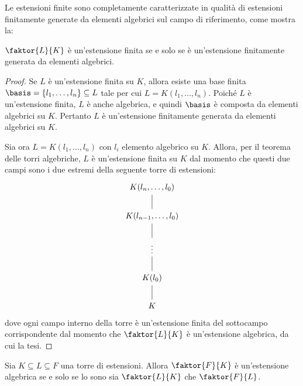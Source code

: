 \documentclass[12pt]{scrartcl}
\begin{document}
	Le estensioni finite sono completamente caratterizzate
	in qualità di estensioni finitamente generate da elementi
	algebrici sul campo di riferimento, come mostra la:
	
	\begin{proposition}
		$\faktor{L}{K}$ è un'estensione finita se e solo se
		è un'estensione finitamente generata da elementi algebrici.
	\end{proposition}
	
	\begin{proof}
		Se $L$ è un'estensione finita su $K$, allora esiste una
		base finita $\basis = \{l_1, \ldots, l_n\} \subseteq L$
		tale per cui $L = K(l_1, \ldots, l_n)$. Poiché $L$ è
		un'estensione finita, $L$ è anche algebrica, e quindi
		$\basis$ è composta da elementi algebrici su $K$. Pertanto
		$L$ è un'estensione finitamente generata da elementi algebrici
		su $K$. \medskip
		
		Sia ora $L = K(l_1, \ldots, l_n)$ con $l_i$ elemento algebrico
		su $K$. Allora, per il teorema delle torri algebriche,
		$L$ è un'estensione
		finita su $K$ dal momento che questi due campi sono
		i due estremi della seguente torre di estensioni:
		\[\begin{tikzcd}
			{K(l_n, \ldots, l_0)} \\
			{K(l_{n-1}, \ldots, l_0) } \\
			\vdots \\
			{K(l_0)} \\
			K
			\arrow[no head, from=1-1, to=2-1]
			\arrow[no head, from=2-1, to=3-1]
			\arrow[no head, from=3-1, to=4-1]
			\arrow[no head, from=4-1, to=5-1]
		\end{tikzcd}\]
		dove ogni campo interno della torre è un'estensione
		finita del sottocampo corrispondente dal momento
		che $\faktor{L}{K}$ è un'estensione algebrica, da
		cui la tesi.
	\end{proof}

	\begin{proposition}
		Sia $K \subseteq L \subseteq F$ una torre di
		estensioni. Allora $\faktor{F}{K}$ è un'estensione 
		algebrica se e solo se lo sono sia $\faktor{L}{K}$
		che $\faktor{F}{L}$.
	\end{proposition}
\end{document}
